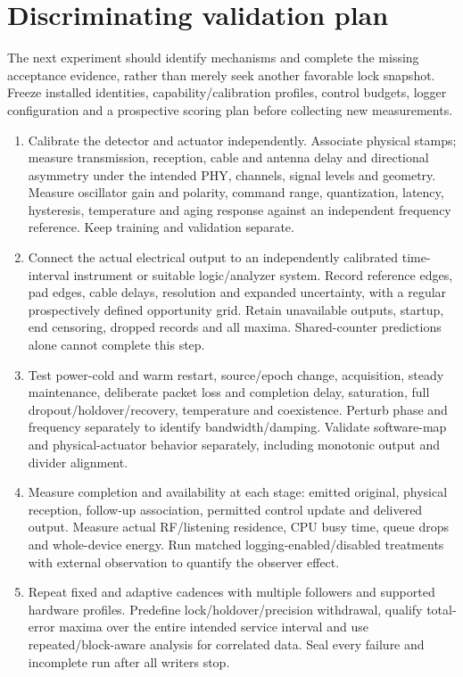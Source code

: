 \documentclass[11pt,letterpaper]{article}
\begin{document}
\section{Discriminating validation plan}
The next experiment should identify mechanisms and complete the missing acceptance evidence, rather than merely seek another favorable lock snapshot. Freeze installed identities, capability/calibration profiles, control budgets, logger configuration and a prospective scoring plan before collecting new measurements.

\begin{enumerate}
\item Calibrate the detector and actuator independently. Associate physical stamps; measure transmission, reception, cable and antenna delay and directional asymmetry under the intended PHY, channels, signal levels and geometry. Measure oscillator gain and polarity, command range, quantization, latency, hysteresis, temperature and aging response against an independent frequency reference. Keep training and validation separate.
\item Connect the actual electrical output to an independently calibrated time-interval instrument or suitable logic/analyzer system. Record reference edges, pad edges, cable delays, resolution and expanded uncertainty, with a regular prospectively defined opportunity grid. Retain unavailable outputs, startup, end censoring, dropped records and all maxima. Shared-counter predictions alone cannot complete this step.
\item Test power-cold and warm restart, source/epoch change, acquisition, steady maintenance, deliberate packet loss and completion delay, saturation, full dropout/holdover/recovery, temperature and coexistence. Perturb phase and frequency separately to identify bandwidth/damping. Validate software-map and physical-actuator behavior separately, including monotonic output and divider alignment.
\item Measure completion and availability at each stage: emitted original, physical reception, follow-up association, permitted control update and delivered output. Measure actual RF/listening residence, CPU busy time, queue drops and whole-device energy. Run matched logging-enabled/disabled treatments with external observation to quantify the observer effect.
\item Repeat fixed and adaptive cadences with multiple followers and supported hardware profiles. Predefine lock/holdover/precision withdrawal, qualify total-error maxima over the entire intended service interval and use repeated/block-aware analysis for correlated data. Seal every failure and incomplete run after all writers stop.
\end{enumerate}
\end{document}
